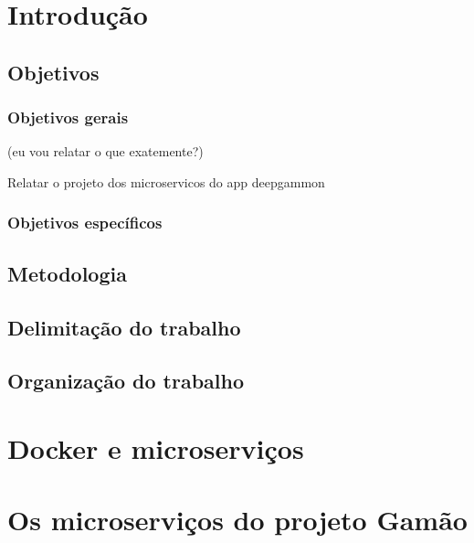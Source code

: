 \documentclass[
	12pt,				%
	openright,			%
	twoside,			%
	a4paper,			%
	english,			%
	french,				%
	spanish,			%
	brazil				%
  ]{abntex2}
\begin{document}
  
\chapter{Introdução}\label{cap_01_introducao}

\section{Objetivos}

\subsection{Objetivos gerais}

(eu vou relatar o que exatemente?)

Relatar o projeto dos microservicos do app deepgammon

\subsection{Objetivos específicos}


\section{Metodologia}

\section{Delimitação do trabalho}

\section{Organização do trabalho}



\chapter{Docker e microserviços}\label{cap_02_microservico}



\chapter{Os microserviços do projeto Gamão}\label{cap_02_gamao}
\end{document}
